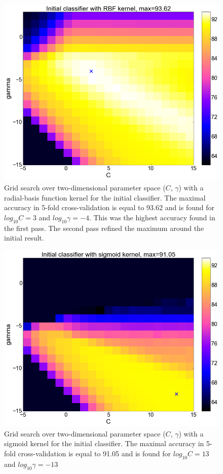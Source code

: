 \begin{center}
\begin{figure}
	\centering
  \includegraphics[width=1\textwidth]{plots/init_rbf}
   \caption{Grid search over two-dimensional parameter space ($C$, $\gamma$) with a radial-basis function kernel for the initial classifier. The maximal accuracy in 5-fold cross-validation is equal to 93.62 and is found for $log_{10}C=3$ and $log_{10}\gamma=-4$. This was the highest accuracy found in the first pass. The second pass refined the maximum around the initial result.}
   \label{fig:initial_rbf}
\end{figure}
\begin{figure}
	\centering
  \includegraphics[width=1\textwidth]{plots/init_sigmoid}
  \caption{Grid search over two-dimensional parameter space ($C$, $\gamma$) with a sigmoid kernel for the initial classifier. The maximal accuracy in 5-fold cross-validation is equal to 91.05 and is found for $log_{10}C=13$ and $log_{10}\gamma=-13$}


\end{figure}
\end{center}
